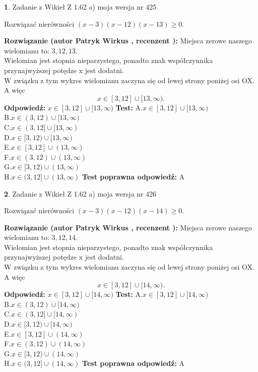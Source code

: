 \documentclass[12pt, a4paper]{article}
\theoremstyle{definition} %
\newtheorem{zad}{}
\newcommand{\zadStart}[1]{\begin{zad}#1\newline}
\newcommand{\zadStop}{\end{zad}}
\newcommand{\rozwStart}[2]{\noindent \textbf{Rozwiązanie (autor #1 , recenzent #2): }\newline}
\newcommand{\rozwStop}{\newline}
\newcommand{\odpStart}{\noindent \textbf{Odpowiedź:}\newline}
\newcommand{\odpStop}{\newline}
\newcommand{\testStart}{\noindent \textbf{Test:}\newline}
\newcommand{\testStop}{\newline}
\newcommand{\kluczStart}{\noindent \textbf{Test poprawna odpowiedź:}\newline}
\newcommand{\kluczStop}{\newline}
\begin{document}
\zadStart{Zadanie z Wikieł Z 1.62 a) moja wersja nr 425}

Rozwiązać nierówności $(x-3)(x-12)(x-13)\ge0$.
\zadStop
\rozwStart{Patryk Wirkus}{}
Miejsca zerowe naszego wielomianu to: $3, 12, 13$.\\
Wielomian jest stopnia nieparzystego, ponadto znak współczynnika przy\linebreak najwyższej potędze x jest dodatni.\\ W związku z tym wykres wielomianu zaczyna się od lewej strony poniżej osi OX. A więc $$x \in [3,12] \cup [13,\infty).$$
\rozwStop
\odpStart
$x \in [3,12] \cup [13,\infty)$
\odpStop
\testStart
A.$x \in [3,12] \cup [13,\infty)$\\
B.$x \in (3,12) \cup [13,\infty)$\\
C.$x \in (3,12] \cup [13,\infty)$\\
D.$x \in [3,12) \cup [13,\infty)$\\
E.$x \in [3,12] \cup (13,\infty)$\\
F.$x \in (3,12) \cup (13,\infty)$\\
G.$x \in [3,12) \cup (13,\infty)$\\
H.$x \in (3,12] \cup (13,\infty)$
\testStop
\kluczStart
A
\kluczStop



\zadStart{Zadanie z Wikieł Z 1.62 a) moja wersja nr 426}

Rozwiązać nierówności $(x-3)(x-12)(x-14)\ge0$.
\zadStop
\rozwStart{Patryk Wirkus}{}
Miejsca zerowe naszego wielomianu to: $3, 12, 14$.\\
Wielomian jest stopnia nieparzystego, ponadto znak współczynnika przy\linebreak najwyższej potędze x jest dodatni.\\ W związku z tym wykres wielomianu zaczyna się od lewej strony poniżej osi OX. A więc $$x \in [3,12] \cup [14,\infty).$$
\rozwStop
\odpStart
$x \in [3,12] \cup [14,\infty)$
\odpStop
\testStart
A.$x \in [3,12] \cup [14,\infty)$\\
B.$x \in (3,12) \cup [14,\infty)$\\
C.$x \in (3,12] \cup [14,\infty)$\\
D.$x \in [3,12) \cup [14,\infty)$\\
E.$x \in [3,12] \cup (14,\infty)$\\
F.$x \in (3,12) \cup (14,\infty)$\\
G.$x \in [3,12) \cup (14,\infty)$\\
H.$x \in (3,12] \cup (14,\infty)$
\testStop
\kluczStart
A
\kluczStop
\end{document}
